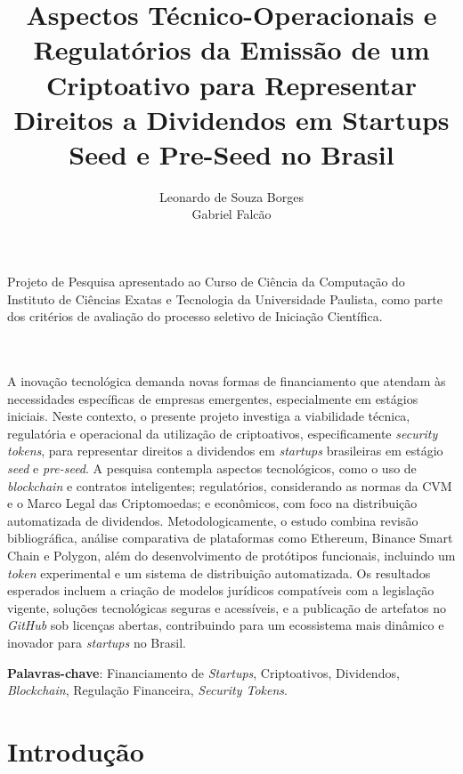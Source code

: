 \documentclass[12pt, a4paper, oneside, openright, chapter=TITLE]{abntex2}
\title{
    Aspectos Técnico-Operacionais e Regulatórios da Emissão de um Criptoativo para Representar Direitos a Dividendos em Startups Seed e Pre-Seed no Brasil \\
    \vspace{0.5cm}
}
\author{Leonardo de Souza Borges \\ Gabriel Falcão}
\renewcommand{\imprimirfolhaderosto}{%
    \begin{titlepage}
        \begin{center}
            {\ABNTEXchapterfont\large\imprimirinstituicao\par}
            \vspace{4cm}

            {\ABNTEXchapterfont\bfseries\Large\imprimirtitulo\par}
            \vspace{3cm}
        \end{center}

        \begin{flushright}
            \begin{minipage}{0.5\textwidth}
                \small
                Projeto de Pesquisa apresentado ao Curso de Ciência da Computação do Instituto de Ciências Exatas e Tecnologia da Universidade Paulista, como parte dos critérios de avaliação do processo seletivo de Iniciação Científica.
                \\
                \imprimirorientadorRotulo
                \\
                ~\imprimirorientador
            \end{minipage}
        \end{flushright}

        \vspace{2cm}

        \begin{center}
            {\ABNTEXchapterfont\large\imprimirautor\par}
            \vspace{2cm}

            {\ABNTEXchapterfont\large\imprimirlocal\par}
            {\ABNTEXchapterfont\large\imprimirdata\par}
        \end{center}
    \end{titlepage}
}
\begin{document}
\setcounter{page}{1}

\imprimirfolhaderosto
%

\clearpage
\begin{resumo}
\vspace{1cm}
A inovação tecnológica demanda novas formas de financiamento que atendam às necessidades específicas de empresas emergentes, especialmente em estágios iniciais. Neste contexto, o presente projeto investiga a viabilidade técnica, regulatória e operacional da utilização de criptoativos, especificamente \textit{security tokens}, para representar direitos a dividendos em \textit{startups} brasileiras em estágio \textit{seed} e \textit{pre-seed}. A pesquisa contempla aspectos tecnológicos, como o uso de \textit{blockchain} e contratos inteligentes; regulatórios, considerando as normas da CVM e o Marco Legal das Criptomoedas; e econômicos, com foco na distribuição automatizada de dividendos. Metodologicamente, o estudo combina revisão bibliográfica, análise comparativa de plataformas como Ethereum, Binance Smart Chain e Polygon, além do desenvolvimento de protótipos funcionais, incluindo um \textit{token} experimental e um sistema de distribuição automatizada. Os resultados esperados incluem a criação de modelos jurídicos compatíveis com a legislação vigente, soluções tecnológicas seguras e acessíveis, e a publicação de artefatos no \textit{GitHub} sob licenças abertas, contribuindo para um ecossistema mais dinâmico e inovador para \textit{startups} no Brasil.


\textbf{Palavras-chave}: Financiamento de \textit{Startups}, Criptoativos, Dividendos, \textit{Blockchain}, Regulação Financeira, \textit{Security Tokens}.
\end{resumo}

\clearpage
{}
\begin{samepage}
\begingroup
\setlength{\parskip}{0pt}
\tableofcontents*
\endgroup
\end{samepage}
\clearpage


\pagestyle{plain} %

\section{Introdução}
\end{document}
